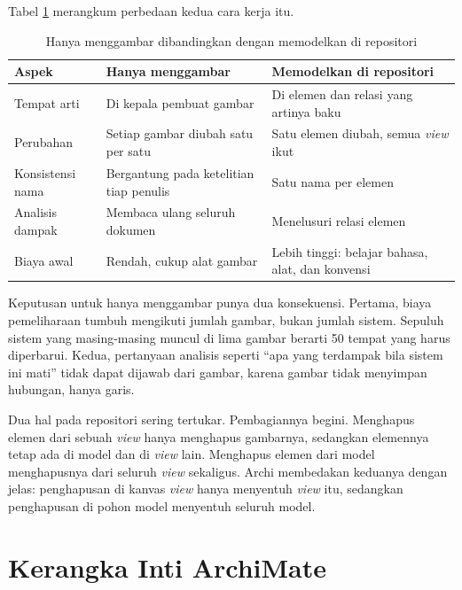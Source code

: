 Tabel \ref{tab:ch04-model-gambar} merangkum perbedaan kedua cara kerja itu.

\begin{table}[!htb]
  \centering
  \caption{Hanya menggambar dibandingkan dengan memodelkan di repositori}
  \label{tab:ch04-model-gambar}
  \begin{tabularx}{\textwidth}{lXX}
    \hline
    \textbf{Aspek} & \textbf{Hanya menggambar} & \textbf{Memodelkan di repositori} \\
    \hline
    Tempat arti & Di kepala pembuat gambar & Di elemen dan relasi yang artinya baku \\
    \hline
    Perubahan & Setiap gambar diubah satu per satu & Satu elemen diubah, semua \textit{view} ikut \\
    \hline
    Konsistensi nama & Bergantung pada ketelitian tiap penulis & Satu nama per elemen \\
    \hline
    Analisis dampak & Membaca ulang seluruh dokumen & Menelusuri relasi elemen \\
    \hline
    Biaya awal & Rendah, cukup alat gambar & Lebih tinggi: belajar bahasa, alat, dan konvensi \\
    \hline
  \end{tabularx}
\end{table}

Keputusan untuk hanya menggambar punya dua konsekuensi. Pertama, biaya
pemeliharaan tumbuh mengikuti jumlah gambar, bukan jumlah sistem. Sepuluh
sistem yang masing-masing muncul di lima gambar berarti 50 tempat yang harus
diperbarui. Kedua, pertanyaan analisis seperti ``apa yang terdampak bila
sistem ini mati'' tidak dapat dijawab dari gambar, karena gambar tidak
menyimpan hubungan, hanya garis.

Dua hal pada repositori sering tertukar. Pembagiannya begini. Menghapus
elemen dari sebuah \textit{view} hanya menghapus gambarnya, sedangkan
elemennya tetap ada di model dan di \textit{view} lain. Menghapus elemen dari
model menghapusnya dari seluruh \textit{view} sekaligus. Archi membedakan
keduanya dengan jelas: penghapusan di kanvas \textit{view} hanya menyentuh
\textit{view} itu, sedangkan penghapusan di pohon model menyentuh seluruh
model.

\section{Kerangka Inti ArchiMate}

